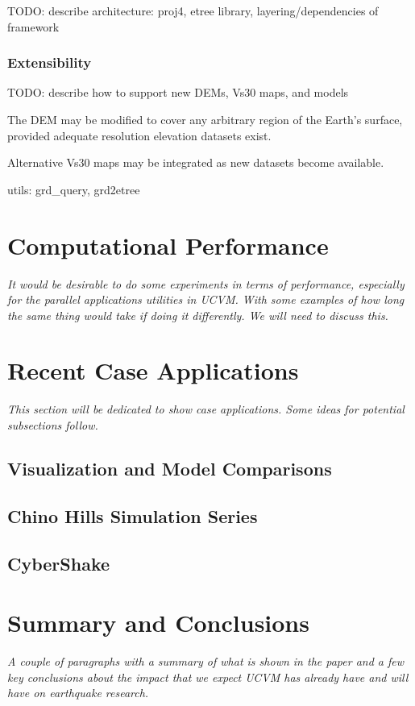 TODO: describe architecture: proj4, etree library, layering/dependencies of framework

\subsubsection{Extensibility}

TODO: describe how to support new DEMs, Vs30 maps, and models

The DEM may be modified to cover any arbitrary region of the Earth's surface, provided adequate resolution elevation datasets exist.

Alternative Vs30 maps may be integrated as new datasets become available. 

utils: grd\_query, grd2etree

\section{Computational Performance}
\label{sec:conclusions}

\textit{
\color{blue}
It would be desirable to do some experiments in terms of performance, especially for the parallel applications utilities in UCVM. With some examples of how long the same thing would take if doing it differently. We will need to discuss this.
}

\section{Recent Case Applications}
\label{sec:conclusions}

\textit{
\color{blue}
This section will be dedicated to show case applications. Some ideas for potential subsections follow.
}

\subsection{Visualization and Model Comparisons}

\subsection{Chino Hills Simulation Series}

\subsection{CyberShake}

\section{Summary and Conclusions}
\label{sec:conclusions}

\textit{
\color{blue}
A couple of paragraphs with a summary of what is shown in the paper and a few key conclusions about the impact that we expect UCVM has already have and will have on earthquake research.
}

